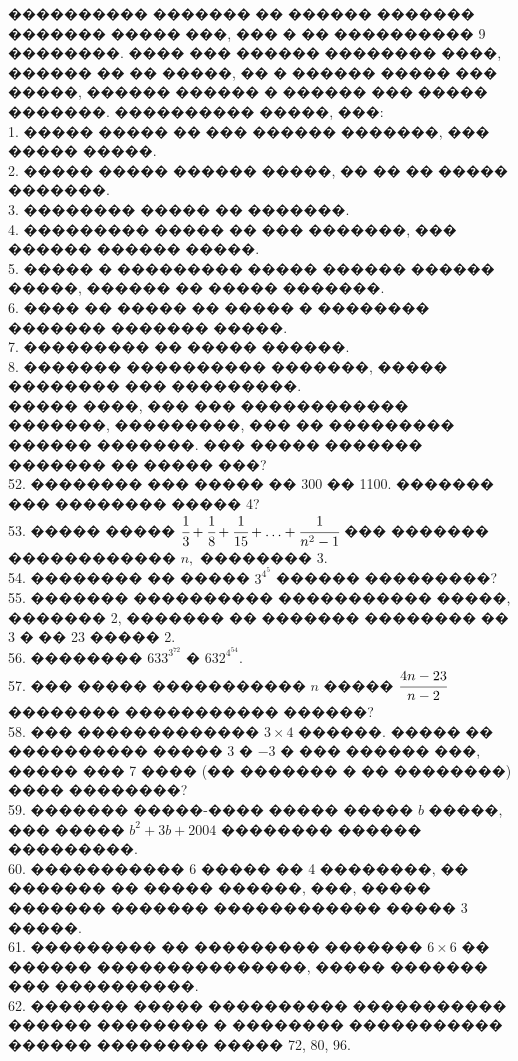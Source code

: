 \documentclass[12pt]{article}
\begin{document}
���������� ������� �� ������ ������� ������� ����� ���, ��� � �� ���������� 9 ��������. ���� ��� ������ �������� ����, ������ �� �� �����, �� � ������ ����� ��� �����, ������ ������ � ������ ��� ����� �������. ���������� �����, ���:\\
1. ����� ����� �� ��� ������ �������, ��� ����� �����.\\
2. ����� ����� ������ �����, �� �� �� ����� �������.\\
3. �������� ����� �� �������.\\
4. ��������� ����� �� ��� �������, ��� ������ ������ �����.\\
5. ����� � ��������� ����� ������ ������ �����, ������ �� ����� �������.\\
6. ���� �� ����� �� ����� � �������� ������� ������� �����.\\
7. ��������� �� ����� ������.\\
8. ������� ���������� �������, ����� �������� ��� ���������.\\
����� ����, ��� ��� ������������ �������, ���������, ��� �� ��������� ������ �������. ��� ����� ������� ������� �� ����� ���?\\
52. �������� ��� ����� �� 300 �� 1100. ������� ��� �������� ����� 4?\\
53. ����� ����� $\cfrac{1}{3}+\cfrac{1}{8}+\cfrac{1}{15}+\ldots+\cfrac{1}{n^2-1}$ ��� ������� ������������ $n,$ �������� 3.\\
54. �������� �� ����� $3^{4^5}$ ������ ���������?\\
55. ������� ���������� ����������� �����, ������� 2, ������� �� ������� �������� �� 3 � �� 23 ����� 2.\\
56. �������� $633^{3^{72}}$ � $632^{4^{54}}.$\\
57. ��� ����� ����������� $n$ ����� $\cfrac{4n-23}{n-2}$ �������� ����������� ������?\\
58. ��� ������������� $3 \times 4$ ������. ����� �� ���������� ����� $3$ � $-3$ � ��� ������ ���, ����� ��� 7 ���� (�� ������� � �� ��������) ���� ��������?\\
59. ������� �����-���� ����� ����� $b$ �����, ��� ����� $b^2+3b+2004$ �������� ������ ���������.\\
60. ����������� 6 ����� �� 4 ��������, �� ������� �� ����� ������, ���, ����� ������� ������� ������������ ����� 3 �����.\\
61. ��������� �� ��������� ������� $6\times 6$ �� ������ ���������������, ����� ������� ��� ����������.\\
62. ������� ����� ���������� ����������� ������ �������� � �������� ����������� ������ �������� ����� 72, 80, 96.\\
\end{document}
